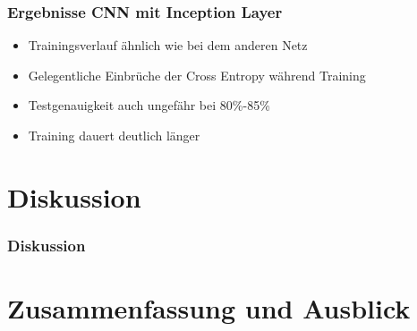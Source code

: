 \documentclass{beamer}
\begin{document}
\begin{frame}
	\frametitle{Ergebnisse CNN mit Inception Layer}
	\begin{figure}
	\end{figure}
	\begin{itemize}
		\item Trainingsverlauf \"{a}hnlich wie bei dem anderen Netz
		\item Gelegentliche Einbrüche der Cross Entropy w\"{a}hrend Training
		\item Testgenauigkeit auch ungefähr bei 80\%-85\%
		\item Training dauert deutlich l\"{a}nger
	\end{itemize}
\end{frame}

\section{Diskussion}

\begin{frame}
	\frametitle{Diskussion}
\end{frame}

\section{Zusammenfassung und Ausblick}
\end{document}
